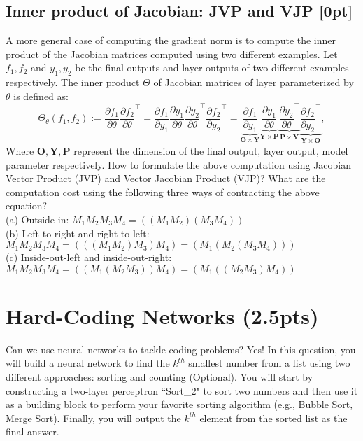 \subsection{Inner product of Jacobian: JVP and VJP {[0pt]} \LIII}
A more general case of computing the gradient norm is to compute the inner product of the Jacobian matrices computed using two different examples. Let $f_1, f_2$ and $y_1, y_2$ be the final outputs and layer outputs of two different examples respectively. The inner product $\Theta$ of Jacobian matrices of layer parameterized by $\theta$ is defined as:
$$
\Theta_{\theta}\left(f_{1}, f_{2}\right):=\frac{\partial f_{1}}{\partial \theta} \frac{\partial f_{2}}{\partial \theta}^{\top}=\frac{\partial f_{1}}{\partial y_{1}} \frac{\partial y_{1}}{\partial \theta} \frac{\partial y_{2}}{\partial \theta}^{\top} \frac{\partial f_{2}}{\partial y_{2}}^{\top}= \underbrace{\frac{\partial f_{1}}{\partial y_{1}}}_{\mathbf{O} \times \mathbf{Y}} \underbrace{\frac{\partial y_{1}}{\partial \theta}}_{\mathbf{Y} \times \mathbf{P}} \underbrace{\frac{\partial y_{2}}{\partial \theta}^{\top}}_{\mathbf{P} \times \mathbf{Y}} \underbrace{\frac{\partial f_{2}}{\partial y_{2}}^{\top}}_{\mathbf{Y} \times \mathbf{O}},
$$
Where $\mathbf{O}, \mathbf{Y}, \mathbf{P}$ represent the dimension of the final output, layer output, model parameter respectively. 
How to formulate the above computation using Jacobian Vector Product (JVP) and Vector Jacobian Product (VJP)? What are the computation cost using the following three ways of contracting the above equation? \\

\noindent (a) Outside-in: $M_1M_2M_3M_4 = ((M_1M_2)(M_3M_4))$  \\
(b) Left-to-right and right-to-left: $M_1M_2M_3M_4=(((M_1M_2)M_3)M_4)=(M_1(M_2(M_3M_4)))$  \\
(c) Inside-out-left and inside-out-right: $M_1M_2M_3M_4 = ((M_1(M_2M_3))M_4) = (M_1((M_2M_3)M_4))$     


\section{Hard-Coding Networks (2.5pts) \LIV}
Can we use neural networks to tackle coding problems? Yes! In this question, you will build a neural network to find the $k^{th}$ smallest number from a list using two different approaches: sorting and counting (Optional). You will start by constructing a two-layer perceptron ``Sort\_2" to sort two numbers and then use it as a building block to perform your favorite sorting algorithm (e.g., Bubble Sort, Merge Sort). Finally, you will output the $k^{th}$ element from the sorted list as the final answer. \\

